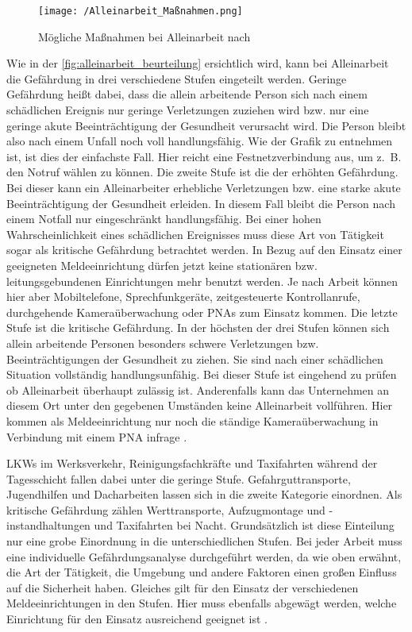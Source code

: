 \documentclass[thesis.tex]{subfiles}
\begin{document}
\begin{figure}[h]
    \centering
    \texttt{[image: /Alleinarbeit\_Maßnahmen.png]}
    \caption{Mögliche Maßnahmen bei Alleinarbeit nach \cite[]{Information_212-139}}
    \label{fig:alleinarbeit_beurteilung}
\end{figure}

Wie in der \autoref{fig:alleinarbeit_beurteilung} ersichtlich wird, kann bei Alleinarbeit die Gefährdung in drei verschiedene Stufen eingeteilt werden.
Geringe Gefährdung heißt dabei, dass die allein arbeitende Person sich nach einem schädlichen Ereignis nur geringe Verletzungen zuziehen wird bzw. nur eine geringe akute Beeinträchtigung der Gesundheit verursacht wird.
Die Person bleibt also nach einem Unfall noch voll handlungsfähig.
Wie der Grafik zu entnehmen ist, ist dies der einfachste Fall.
Hier reicht eine Festnetzverbindung aus, um z.~B. den Notruf wählen zu können.
Die zweite Stufe ist die der erhöhten Gefährdung.
Bei dieser kann ein Alleinarbeiter erhebliche Verletzungen bzw. eine starke akute Beeinträchtigung der Gesundheit erleiden.
In diesem Fall bleibt die Person nach einem Notfall nur eingeschränkt handlungsfähig.
Bei einer hohen Wahrscheinlichkeit eines schädlichen Ereignisses muss diese Art von Tätigkeit sogar als kritische Gefährdung betrachtet werden.
In Bezug auf den Einsatz einer geeigneten Meldeeinrichtung dürfen jetzt keine stationären bzw. leitungsgebundenen Einrichtungen mehr benutzt werden.
Je nach Arbeit können hier aber Mobiltelefone, Sprechfunkgeräte, zeitgesteuerte Kontrollanrufe, durchgehende Kameraüberwachung oder PNAs zum Einsatz kommen.
Die letzte Stufe ist die kritische Gefährdung.
In der höchsten der drei Stufen können sich allein arbeitende Personen besonders schwere Verletzungen bzw. Beeinträchtigungen der Gesundheit zu ziehen.
Sie sind nach einer schädlichen Situation vollständig handlungsunfähig.
Bei dieser Stufe ist eingehend zu prüfen ob Alleinarbeit überhaupt zulässig ist.
Anderenfalls kann das Unternehmen an diesem Ort unter den gegebenen Umständen keine Alleinarbeit vollführen.
Hier kommen als Meldeeinrichtung nur noch die ständige Kameraüberwachung in Verbindung mit einem PNA infrage \cite[vgl.~S.~7-9]{Information_212-139}.

LKWs im Werksverkehr, Reinigungsfachkräfte und Taxifahrten während der Tagesschicht fallen dabei unter die geringe Stufe.
Gefahrguttransporte, Jugendhilfen und Dacharbeiten lassen sich in die zweite Kategorie einordnen.
Als kritische Gefährdung zählen Werttransporte, Aufzugmontage und -instandhaltungen und Taxifahrten bei Nacht.
Grundsätzlich ist diese Einteilung nur eine grobe Einordnung in die unterschiedlichen Stufen.
Bei jeder Arbeit muss eine individuelle Gefährdungsanalyse durchgeführt werden, da wie oben erwähnt, die Art der Tätigkeit, die Umgebung und andere Faktoren einen großen Einfluss auf die Sicherheit haben.
Gleiches gilt für den Einsatz der verschiedenen Meldeeinrichtungen in den Stufen.
Hier muss ebenfalls abgewägt werden, welche Einrichtung für den Einsatz ausreichend geeignet ist \cite[vgl.~S.~7-9]{Information_212-139}.
\end{document}
